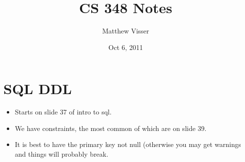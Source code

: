 \documentclass[12pt]{article}
\begin{document}
\title{CS 348 Notes}
\author{Matthew Visser}
\date{Oct  6, 2011}
\maketitle

\section{SQL DDL}

\begin{itemize}
	\item Starts on slide 37 of intro to sql.
	\item We have constraints, the most common of which are on slide 39.
	\item It is best to have the primary key not null (otherwise you may get
		warnings and things will probably break.
\end{itemize}
\end{document}
